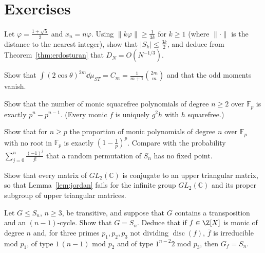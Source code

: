 \section{Exercises}

\begin{exercise}[$\star\star$]\label{ex:golden}
Let $\varphi=\frac{1+\sqrt5}2$ and $x_n=n\varphi$. Using $\|k\varphi\|\ge\frac1{3k}$ for $k\ge1$ (where $\|\cdot\|$ is the distance to the nearest integer), show that $|S_k|\le\frac{3k}2$, and deduce from Theorem~\ref{thm:erdosturan} that $D_N=O(N^{-1/3})$.
\end{exercise}

\begin{exercise}[$\star$]\label{ex:catalan}
Show that $\int(2\cos\theta)^{2m}\dd\mu_{ST}=C_m=\frac1{m+1}\binom{2m}m$ and that the odd moments vanish.
\end{exercise}

\begin{exercise}[$\star$]\label{ex:squarefreecount}
Show that the number of monic squarefree polynomials of degree $n\ge2$ over $\mathbb F_p$ is exactly $p^n-p^{n-1}$. (Every monic $f$ is uniquely $g^2h$ with $h$ squarefree.)
\end{exercise}

\begin{exercise}[$\star\star$]\label{ex:noroot}
Show that for $n\ge p$ the proportion of monic polynomials of degree $n$ over $\mathbb F_p$ with no root in $\mathbb F_p$ is exactly $(1-\frac1p)^p$. Compare with the probability $\sum_{j=0}^n\frac{(-1)^j}{j!}$ that a random permutation of $S_n$ has no fixed point.
\end{exercise}

\begin{exercise}[$\star$]\label{ex:jordaninfinite}
Show that every matrix of $GL_2(\mathbb C)$ is conjugate to an upper triangular matrix, so that Lemma~\ref{lem:jordan} fails for the infinite group $GL_2(\mathbb C)$ and its proper subgroup of upper triangular matrices.
\end{exercise}

\begin{exercise}[$\star\star$]\label{ex:snrecognize}
Let $G\le S_n$, $n\ge3$, be transitive, and suppose that $G$ contains a transposition and an $(n-1)$-cycle. Show that $G=S_n$. Deduce that if $f\in\Z[X]$ is monic of degree $n$ and, for three primes $p_1,p_2,p_3$ not dividing $\operatorname{disc}(f)$, $\bar f$ is irreducible mod $p_1$, of type $1\,(n-1)$ mod $p_2$ and of type $1^{n-2}2$ mod $p_3$, then $G_f=S_n$.
\end{exercise}

